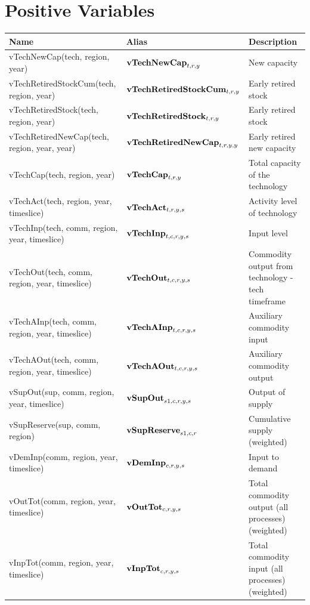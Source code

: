 \documentclass{article}
\begin{document}
\section*{Positive Variables}
\begin{longtable}{|p{10cm}|p{5cm}|p{9cm}|}
\hline
\bf{Name} & \bf{Alias}   & \bf{Description} \\
 \hline
vTechNewCap(tech, region, year) & ${\bf vTechNewCap}_{t,r,y}$ & New capacity \\
 \hline
vTechRetiredStockCum(tech, region, year) & ${\bf vTechRetiredStockCum}_{t,r,y}$ & Early retired stock \\
 \hline
vTechRetiredStock(tech, region, year) & ${\bf vTechRetiredStock}_{t,r,y}$ & Early retired stock \\
 \hline
vTechRetiredNewCap(tech, region, year, year) & ${\bf vTechRetiredNewCap}_{t,r,y,y}$ & Early retired new capacity \\
 \hline
vTechCap(tech, region, year) & ${\bf vTechCap}_{t,r,y}$ & Total capacity of the technology \\
 \hline
vTechAct(tech, region, year, timeslice) & ${\bf vTechAct}_{t,r,y,s}$ & Activity level of technology \\
 \hline
vTechInp(tech, comm, region, year, timeslice) & ${\bf vTechInp}_{t,c,r,y,s}$ & Input level \\
 \hline
vTechOut(tech, comm, region, year, timeslice) & ${\bf vTechOut}_{t,c,r,y,s}$ & Commodity output from technology - tech timeframe \\
 \hline
vTechAInp(tech, comm, region, year, timeslice) & ${\bf vTechAInp}_{t,c,r,y,s}$ & Auxiliary commodity input \\
 \hline
vTechAOut(tech, comm, region, year, timeslice) & ${\bf vTechAOut}_{t,c,r,y,s}$ & Auxiliary commodity output \\
 \hline
vSupOut(sup, comm, region, year, timeslice) & ${\bf vSupOut}_{s1,c,r,y,s}$ & Output of supply \\
 \hline
vSupReserve(sup, comm, region) & ${\bf vSupReserve}_{s1,c,r}$ & Cumulative supply (weighted) \\
 \hline
vDemInp(comm, region, year, timeslice) & ${\bf vDemInp}_{c,r,y,s}$ & Input to demand \\
 \hline
vOutTot(comm, region, year, timeslice) & ${\bf vOutTot}_{c,r,y,s}$ & Total commodity output (all processes) (weighted) \\
 \hline
vInpTot(comm, region, year, timeslice) & ${\bf vInpTot}_{c,r,y,s}$ & Total commodity input (all processes) (weighted) \\

\end{longtable}
\end{document}
